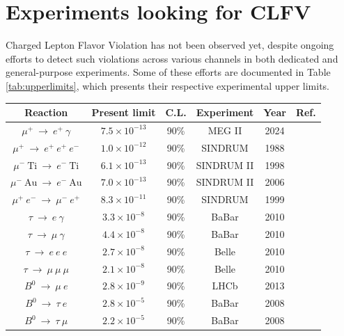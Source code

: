 \section{Experiments looking for CLFV}
Charged Lepton Flavor Violation has not been observed yet, despite ongoing efforts to detect such violations across various channels in both dedicated and general-purpose experiments. Some of these efforts are documented in Table \ref{tab:upperlimits}, which presents their respective experimental upper limits.
\begin{center}  
\begin{table}[!h]
\centering
\renewcommand{\arraystretch}{1.5}
\begin{tabular}{c c c c c c}
\hline
Reaction & Present limit & C.L. & Experiment &  Year & Ref.\\
\hline
$\mu^+\ \rightarrow \ e^+ \ \gamma$& $7.5 \times 10^{-13}$ & 90\% & MEG II & 2024 & \cite{megiicollaboration2024search}\\
$\mu^+ \ \rightarrow \ e^+ \ e^+ \ e^-$ & $1.0 \times 10^{-12}$ & 90\% & SINDRUM & 1988 & \cite{SINDRUM:1987nra} \\
$\mu^- \ \text{Ti}\ \rightarrow \ e^- \ \text{Ti}$ &  $6.1 \times 10^{-13}$ & 90\% & SINDRUM II & 1998 & \cite{titanium}\\
$\mu^- \ \text{Au}\ \rightarrow \ e^- \ \text{Au}$ & $7.0 \times 10^{-13}$ & 90\% & SINDRUM II & 2006 & \cite{SINDRUMII:2006dvw} \\
$\mu^+ \ e^- \ \rightarrow \ \mu^- \ e^+$ & $8.3 \times 10^{-11}$ & 90\% & SINDRUM & 1999 & \cite{Willmann:1998gd}\\
$\tau \ \rightarrow \ e \ \gamma$ & $3.3 \times 10^{-8}$ & 90\% & BaBar & 2010 & \cite{Aubert_2010}\\
$\tau \ \rightarrow \ \mu \ \gamma$ & $4.4 \times 10^{-8}$ & 90\% & BaBar & 2010 & \cite{Aubert_2010}\\
$\tau \ \rightarrow \ e \ e \  e$ & $2.7 \times 10^{-8}$ & 90\% & Belle & 2010 & \cite{Hayasaka_2010}\\
$\tau \ \rightarrow \ \mu \ \mu  \ \mu$ & $2.1 \times 10^{-8}$ & 90\% & Belle & 2010 & \cite{Hayasaka_2010} \\
$B^0 \ \rightarrow \ \mu \ e$ & $2.8 \times 10^{-9}$ & 90\% & LHCb & 2013 & \cite{PhysRevLett.111.141801}\\
$B^0 \ \rightarrow \ \tau \ e$ & $2.8 \times 10^{-5}$ & 90\% & BaBar & 2008 & \cite{PhysRevD.77.091104}\\
$B^0 \ \rightarrow \ \tau \ \mu$ & $2.2 \times 10^{-5}$ & 90\% & BaBar & 2008 & \cite{PhysRevD.77.091104}\\

\end{tabular}
\end{table}
\end{center}
